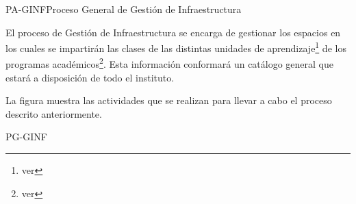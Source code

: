 
\begin{procesoGeneral}{PA-GINF}{Proceso General de Gestión de Infraestructura} {
		
		
		El proceso de Gestión de Infraestructura se encarga de gestionar los espacios en los cuales se impartirán las clases de las distintas unidades de aprendizaje\footnote{ver } de los programas académicos\footnote{ver }. Esta información conformará un catálogo general que estará a disposición de todo el instituto.
					
		\noindent La figura  muestra las actividades que se realizan para llevar a cabo el proceso descrito anteriormente.
		
	}{PG-GINF}

\end{procesoGeneral}

